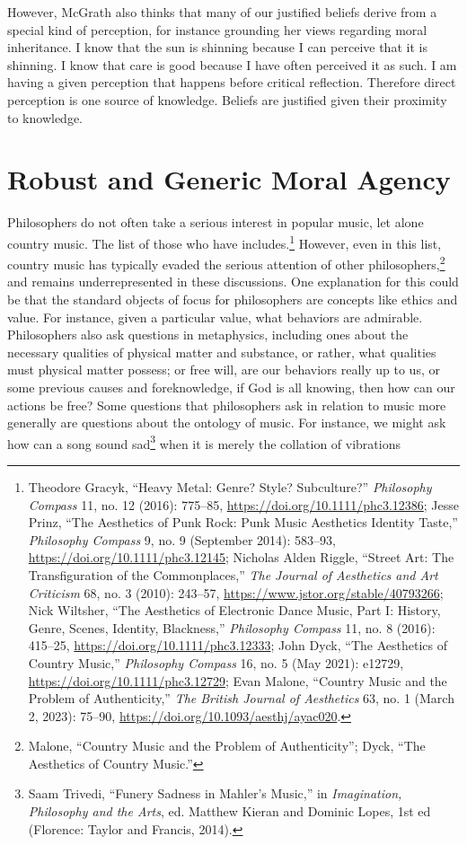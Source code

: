 \documentclass[phdthesis,12pt,final]{wuthesis}
\theoremstyle{definition}
\theoremstyle{definition}
\theoremstyle{definition}
\theoremstyle{definition}
\theoremstyle{remark}
\begin{document}
However, McGrath also thinks that many of our justified beliefs derive from a special kind of perception, for instance grounding her views regarding moral inheritance. I know that the sun is shinning because I can perceive that it is shinning. I know that care is good because I have often perceived it as such. I am having a given perception that happens before critical reflection. Therefore direct perception is one source of knowledge. Beliefs are justified given their proximity to knowledge.

\chapter{Robust and Generic Moral Agency}\label{robust-and-generic-moral-agency}

Philosophers do not often take a serious interest in popular music, let alone country music. The list of those who have includes.\footnote{Theodore Gracyk, {``Heavy Metal: Genre? {Style}? {Subculture}?''} \emph{Philosophy Compass} 11, no. 12 (2016): 775--85, \url{https://doi.org/10.1111/phc3.12386}; Jesse Prinz, {``The {Aesthetics} of {Punk Rock}: {Punk Music Aesthetics Identity Taste},''} \emph{Philosophy Compass} 9, no. 9 (September 2014): 583--93, \url{https://doi.org/10.1111/phc3.12145}; Nicholas Alden Riggle, {``Street {Art}: {The Transfiguration} of the {Commonplaces},''} \emph{The Journal of Aesthetics and Art Criticism} 68, no. 3 (2010): 243--57, \url{https://www.jstor.org/stable/40793266}; Nick Wiltsher, {``The {Aesthetics} of {Electronic Dance Music}, {Part I}: {History}, {Genre}, {Scenes}, {Identity}, {Blackness},''} \emph{Philosophy Compass} 11, no. 8 (2016): 415--25, \url{https://doi.org/10.1111/phc3.12333}; John Dyck, {``The Aesthetics of Country Music,''} \emph{Philosophy Compass} 16, no. 5 (May 2021): e12729, \url{https://doi.org/10.1111/phc3.12729}; Evan Malone, {``Country {Music} and the {Problem} of {Authenticity},''} \emph{The British Journal of Aesthetics} 63, no. 1 (March 2, 2023): 75--90, \url{https://doi.org/10.1093/aesthj/ayac020}.} However, even in this list, country music has typically evaded the serious attention of other philosophers,\footnote{Malone, {``Country {Music} and the {Problem} of {Authenticity}''}; Dyck, {``The Aesthetics of Country Music.''}} and remains underrepresented in these discussions. One explanation for this could be that the standard objects of focus for philosophers are concepts like ethics and value. For instance, given a particular value, what behaviors are admirable. Philosophers also ask questions in metaphysics, including ones about the necessary qualities of physical matter and substance, or rather, what qualities must physical matter possess; or free will, are our behaviors really up to us, or some previous causes and foreknowledge, if God is all knowing, then how can our actions be free? Some questions that philosophers ask in relation to music more generally are questions about the ontology of music. For instance, we might ask how can a song sound sad\footnote{Saam Trivedi, {``Funery {Sadness} in {Mahler}'s {Music},''} in \emph{Imagination, {Philosophy} and the {Arts}}, ed. Matthew Kieran and Dominic Lopes, 1st ed (Florence: {Taylor and Francis}, 2014).} when it is merely the collation of vibrations 
\end{document}
